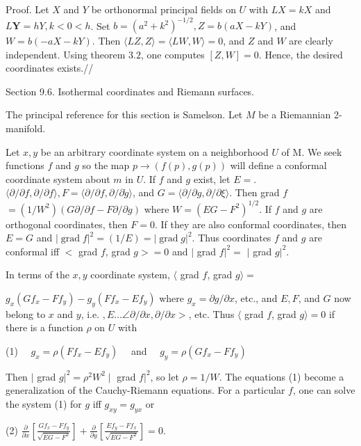 \documentclass[10pt]{article}
\begin{document}
Proof. Let $X$ and $Y$ be orthonormal principal fields on $U$ with $L X=k X$ and $L \boldsymbol{Y}=h Y, k<0<h$. Set $b=\left(a^{2}+k^{2}\right)^{-1 / 2}, Z=b(a X-k Y)$, and $W=b(-a X-k Y)$. Then $\langle L Z, Z\rangle=\langle L W, W\rangle=0$, and $Z$ and $W$ are clearly independent. Using theorem $3.2$, one computes $[Z, W]=0$. Hence, the desired coordinates exists.//

Section 9.6. Isothermal coordinates and Riemann surfaces.

The principal reference for this section is Samelson. Let $M$ be a Riemannian 2-manifold.

Let $x, y$ be an arbitrary coordinate system on a neighborhood $U$ of M. We seek functions $f$ and $g$ so the map $p \rightarrow(f(p), g(p))$ will define a conformal coordinate system about $m$ in $U$. If $f$ and $g$ exist, let $E=$. $\langle\partial / \partial f, \partial / \partial f\rangle, F=\langle\partial / \partial f, \partial / \partial \dot{g}\rangle$, and $G=\langle\partial / \partial g, \partial / \partial \xi\rangle$. Then grad $f$ $=\left(1 / W^{2}\right)(G \partial / \partial f-F \partial / \partial g)$ where $W=\left(E G-F^{2}\right)^{1 / 2} .$ If $f$ and $g$ are orthogonal coordinates, then $F=0$. If they are also conformal coordinates, then $E=G$ and $|\operatorname{grad} f|^{2}=(1 / E)=|\operatorname{grad} g|^{2}$. Thus coordinates $f$ and $g$ are conformal iff $<$ grad $f$, grad $g>=0$ and $\mid$ grad $\left.f\right|^{2}=$ $\mid$ grad $\left.g\right|^{2} .$

In terms of the $x, y$ coordinate system, $\langle$ grad $f$, grad $g\rangle=$

$g_{x}\left(G f_{x}-F f_{y}\right)-g_{y}\left(F f_{x}-E f_{y}\right)$ where $g_{x}=\partial g / \partial x$, etc., and $E, F$, and $G$ now belong to $x$ and $y$, i.e. $, E \ldots \angle \partial / \partial x, \partial / \partial x>$, etc. Thus $\langle$ grad $f$, grad $g\rangle=0$ if there is a function $\rho$ on $U$ with

(1) $\quad g_{x}=\rho\left(F f_{x}-E f_{y}\right) \quad$ and $\quad g_{y}=\rho\left(G f_{x}-F f_{y}\right)$

Then $\mid$ grad $\left.g\right|^{2}=\rho^{2} W^{2} \mid$ grad $\left.f\right|^{2}$, so let $\rho=1 / W .$ The equations (1) become a generalization of the Cauchy-Riemann equations. For a particular $f$, one can solve the system (1) for $g$ iff $g_{x y}=g_{y x}$ or

(2) $\frac{\partial}{\partial x}\left[\frac{G f_{x}-F f_{y}}{\sqrt{E G-F^{2}}}\right]+\frac{\partial}{\partial y}\left[\frac{E f_{y}-F f_{x}}{\sqrt{E G-F^{2}}}\right]=0$.
\end{document}
